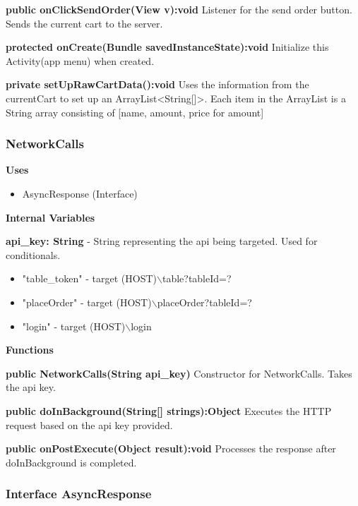 \documentclass [10pt]{article}
\begin{document}
\textbf{public onClickSendOrder(View v):void}
Listener for the send order button. Sends the current cart to the server.

\textbf{protected onCreate(Bundle savedInstanceState):void}
Initialize this Activity(app menu) when created.

\textbf{private setUpRawCartData():void}
Uses the information from the currentCart to set up an ArrayList<String[]>. Each item in the ArrayList is a String array consisting of [name, amount, price for amount]


\subsubsection{NetworkCalls}

\textbf{Uses}
\begin{itemize}
	\item AsyncResponse (Interface)
\end{itemize}
\textbf{Internal Variables}

\textbf{api\_key: String} - String representing the api being targeted. Used for conditionals.

\begin{itemize}
	\item "table\_token" - target (HOST)$\backslash$table?tableId=?
	\item "placeOrder" - target (HOST)$\backslash$placeOrder?tableId=?
	\item "login" - target (HOST)$\backslash$login
\end{itemize}

\textbf{Functions}

\textbf{public NetworkCalls(String api\_key)}
Constructor for NetworkCalls. Takes the api key.

\textbf{public doInBackground(String[] strings):Object}
Executes the HTTP request based on the api key provided.

\textbf{public onPostExecute(Object result):void}
Processes the response after doInBackground is completed.


\subsubsection{Interface AsyncResponse}
\end{document}
